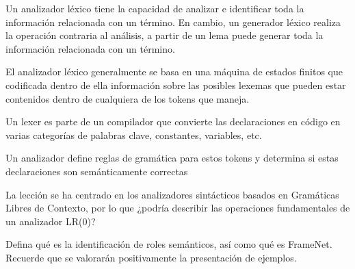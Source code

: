 \documentclass[11pt]{exam}
\begin{document}
\begin{questions}
Un analizador léxico tiene la capacidad de analizar e identificar toda la información relacionada con un término. En cambio, un generador léxico realiza la operación contraria al análisis, a partir de un lema puede generar toda la información relacionada con un término.

El analizador léxico generalmente se basa en una máquina de estados finitos que codificada dentro de ella información sobre las posibles lexemas que pueden estar contenidos dentro de cualquiera de los tokens que maneja.

Un lexer es parte de un compilador que convierte las declaraciones en código en varias categorías de palabras clave, constantes, variables, etc.

Un analizador define reglas de gramática para estos tokens y determina si estas declaraciones son semánticamente correctas

\question La lección se ha centrado en los analizadores sintácticos basados en Gramáticas Libres de Contexto, por lo que ¿podría describir las operaciones fundamentales de un analizador LR(0)?

\question Defina qué es la identificación de roles semánticos, así como qué es FrameNet. Recuerde que se valorarán positivamente la presentación de ejemplos.

\end{questions}
\end{document}

